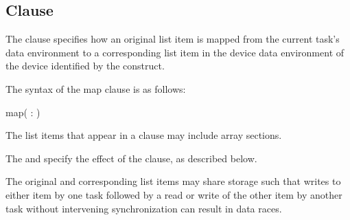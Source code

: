 \subsection{ Clause}
\label{subsec:map Clause}
\summary
The  clause specifies how an original list item is mapped from the current task's data environment to a corresponding list item in the device data environment of the device identified by the construct.

\syntax
The syntax of the map clause is as follows:

\begin{boxedcode}
map(\plc{[ [map-type-modifier[,]] map-type} : \plc{] list})\end{boxedcode}

\descr
The list items that appear in a  clause may include array sections.

The  and  specify the effect of the  clause, as described below.

The original and corresponding list items may share storage such that writes to either
item by one task followed by a read or write of the other item by another task without
intervening synchronization can result in data races.

